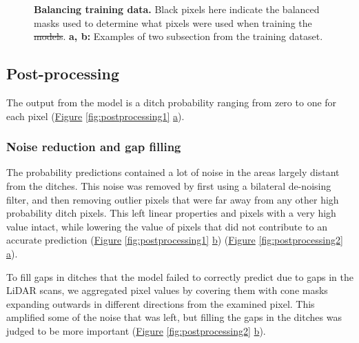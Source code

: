 \documentclass[11pt, review]{elsarticle} %
\providecommand{\DIFaddtex}[1]{{\protect\color{blue}\uwave{#1}}} %
\providecommand{\DIFdeltex}[1]{{\protect\color{red}\sout{#1}}}                      %
\providecommand{\DIFaddFL}[1]{\DIFadd{#1}} %
\providecommand{\DIFdelFL}[1]{\DIFdel{#1}} %
\providecommand{\DIFaddbeginFL}{} %
\providecommand{\DIFaddendFL}{} %
\providecommand{\DIFdelbeginFL}{} %
\providecommand{\DIFdelendFL}{} %
\providecommand{\DIFadd}[1]{\texorpdfstring{\DIFaddtex{#1}}{#1}} %
\providecommand{\DIFdel}[1]{\texorpdfstring{\DIFdeltex{#1}}{}} %
\begin{document}
\begin{figure} [!htb]
    \caption{\textbf{Balancing training data.} Black pixels here indicate the balanced masks used to determine what pixels were used when training the \DIFdelbeginFL \DIFdelFL{models}\DIFdelendFL \DIFaddbeginFL \DIFaddFL{model}\DIFaddendFL . \textbf{a, b: }Examples of two subsection from the training dataset.}
    \label{fig:balancedmasks}
\end{figure}


\subsection{Post-processing}

The output from the model is a ditch probability ranging from zero to one for each pixel (\hyperref[fig:postprocessing1]{Figure} \ref{fig:postprocessing1} \hyperref[fig:postprocessing1]{a}).

\subsubsection{Noise reduction and gap filling}

The probability predictions contained a lot of noise in the areas largely distant from the ditches. This noise was removed by first using a bilateral de-noising filter, and then removing outlier pixels that were far away from any other high probability ditch pixels. This left linear properties and pixels with a very high value intact, while lowering the value of pixels that did not contribute to an accurate prediction (\hyperref[fig:postprocessing1]{Figure} \ref{fig:postprocessing1} \hyperref[fig:postprocessing1]{b}) (\hyperref[fig:postprocessing2]{Figure} \ref{fig:postprocessing2} \hyperref[fig:postprocessing2]{a}).

To fill gaps in ditches that the model failed to correctly predict due to gaps in the LiDAR scans, we aggregated pixel values by covering them with cone masks expanding outwards in different directions from the examined pixel. This amplified some of the noise that was left, but filling the gaps in the ditches was judged to be more important (\hyperref[fig:postprocessing2]{Figure} \ref{fig:postprocessing2} \hyperref[fig:postprocessing2]{b}).
\end{document}
